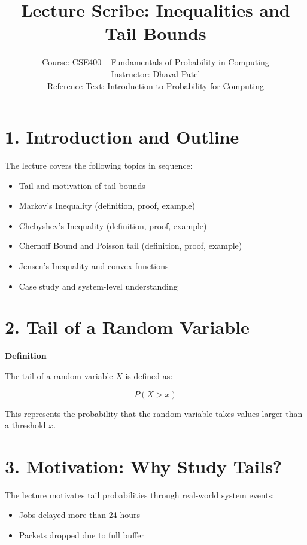 \documentclass[12pt]{article}
\begin{document}
\title{Lecture Scribe: Inequalities and Tail Bounds}
\author{Course: CSE400 – Fundamentals of Probability in Computing \\ Instructor: Dhaval Patel \\ Reference Text: Introduction to Probability for Computing}
\date{}
\maketitle

\section*{1. Introduction and Outline}

The lecture covers the following topics in sequence:

\begin{itemize}
\item Tail and motivation of tail bounds
\item Markov’s Inequality (definition, proof, example)
\item Chebyshev’s Inequality (definition, proof, example)
\item Chernoff Bound and Poisson tail (definition, proof, example)
\item Jensen’s Inequality and convex functions
\item Case study and system-level understanding
\end{itemize}

\section*{2. Tail of a Random Variable}

\textbf{Definition}

The tail of a random variable $X$ is defined as:

\[
P(X > x)
\]

This represents the probability that the random variable takes values larger than a threshold $x$.

\section*{3. Motivation: Why Study Tails?}

The lecture motivates tail probabilities through real-world system events:

\begin{itemize}
\item Jobs delayed more than 24 hours
\item Packets dropped due to full buffer
\end{itemize}
\end{document}
